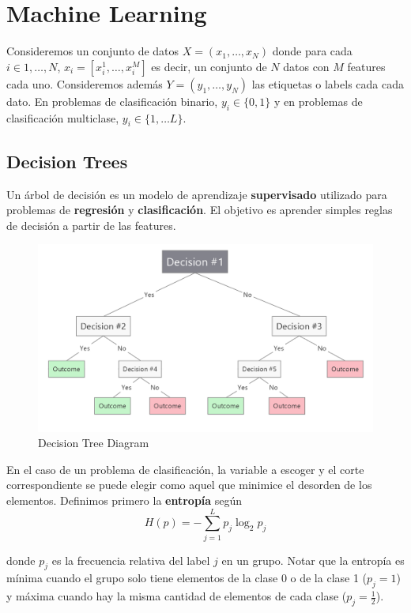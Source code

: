 \section{Machine Learning}

Consideremos un conjunto de datos $X = (x_1, \dots , x_N)$ donde para cada $i \in {1, \dots, N}$, $x_i = [x_{i}^1 , \dots, x_{i}^M]$ es decir, un conjunto de $N$ datos con $M$ features cada uno. Consideremos además $Y = (y_1, \dots , y_N)$ las etiquetas o labels cada cada dato. En problemas de clasificación binario, $y_i \in \{ 0, 1\}$ y en problemas de clasificación multiclase, $y_i \in \{1, \dots L\}$.

\subsection{Decision Trees}

Un árbol de decisión es un modelo de aprendizaje \textbf{supervisado} utilizado para problemas de \textbf{regresión} y \textbf{clasificación}. El objetivo es aprender simples reglas de decisión a partir de las features. 

\begin{figure}[htbp]
    \center
    \includegraphics[scale=0.25]{notebooks/ML/img/decision_tree_diagram.png}
    \caption{Decision Tree Diagram}
\end{figure}

En el caso de un problema de clasificación, la variable a escoger y el corte correspondiente se puede elegir como aquel que minimice el desorden de los elementos. Definimos primero la \textbf{entropía} según 
$$H(p) = - \sum_{j=1}^{L}p_j\log_{2}p_j$$

donde $p_j$ es la frecuencia relativa del label $j$ en un grupo. Notar que la entropía es mínima cuando el grupo solo tiene elementos de la clase 0 o de la clase 1 ($p_j = 1$) y máxima cuando hay la misma cantidad de elementos de cada clase ($p_j = \frac{1}{2}$). 

